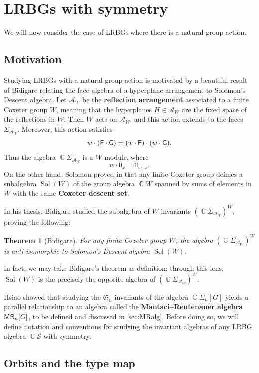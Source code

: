 \documentclass[11pt, oneside, reqno]{amsart}
\newtheorem{theorem}{Theorem}[section]
\theoremstyle{definition}
\numberwithin{equation}{section}
\DeclareMathOperator{\C}{\mathbb{C}}
\newcommand{\defn}[1]{{\color{RoyalBlue}\bf#1}}
\def \A{{\mathcal{A}}}
\def \MR {{\sf{MR}}}
\def \SS{{\mathcal{S}}}
\def \kk{\C}
\def \sym{\mathfrak{S}}
\def \gsetcomposition{{\Sigma_n[G]}}
\def \hsiao {{\gsetcomposition}}
\DeclareMathOperator{\sol}{Sol}
\newcommand{\B}[1]{\mathtt{#1}} 			%
\begin{document}
\section{LRBGs with symmetry}\label{sec:LRBGsymmetry}
We will now consider the case of LRBGs where there is a natural group action. 

\subsection{Motivation}
Studying LRBGs with a natural group action is motivated by a beautiful result of Bidigare \cite{bidigare} relating the face algebra of a hyperplane arrangement to Solomon's Descent algebra. Let $\A_W$ be the \defn{reflection arrangement} associated to a finite Coxeter group $W$, meaning that the hyperplanes $H \in \A_W$ are the fixed space of the reflections in $W$. Then $W$ acts on $\A_W$, and this action extends to the faces $\Sigma_{\A_W}$.
Moreover, this action satisfies
\[ w \cdot ({\sf F \cdot G}) = (w \cdot {\sf F}) \cdot (w \cdot {\sf G}). \]
Thus the algebra $\kk \Sigma_{\A_W}$ is a $W$-module, where 
\[ w \cdot \B{H}_x = \B{H}_{w\cdot x}.\]
On the other hand, Solomon proved in \cite{solomon} that any finite Coxeter group defines a subalgebra $\sol(W)$ of the group algebra $\kk W$ spanned by sums of elements in $W$ with the same \defn{Coxeter descent set}. 

In his thesis, Bidigare studied the subalgebra of $W$-invariants $\left( \kk \Sigma_{\A_W} \right)^W$, proving the following:
\begin{theorem}[Bidigare]\label{thm:bidigare}
    For any finite Coxeter group $W$, the algebra $\left( \kk \Sigma_{\A_W} \right)^W$ is anti-isomorphic to Solomon's Descent algebra $\sol(W)$.
\end{theorem}
In fact, we may take Bidigare's theorem as definition; through this lens, $\sol(W)$ is the precisely the opposite algebra of $\left( \kk \Sigma_{\A_W} \right)^W$.

Hsiao showed that studying the $\sym_n$-invariants of 
the algebra $\kk\hsiao$ yields a parallel relationship to an algebra called the \defn{Mantaci--Reutenauer algebra} $\MR_n[G]$, to be defined and discussed in \cref{sec:MRalg}. Before doing so, we will define notation and conventions for studying the invariant algebras of any LRBG algebra $\kk \SS$ with symmetry. 

\subsection{Orbits and the type map}\label{sec:orbitstypemap}
\end{document}
